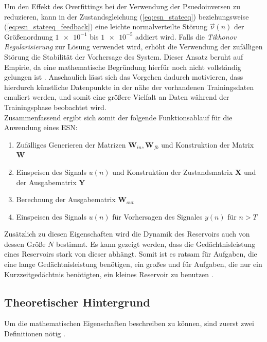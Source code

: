 Um den Effekt des Overfittings bei der Verwendung der Psuedoinversen zu reduzieren, kann in der Zustandsgleichung (\ref{eq:esn_stateeq}) beziehungsweise (\ref{eq:esn_stateeq_feedback}) eine leichte normalverteilte Störung $\vec{\nu}(n)$ der Größenordnung $\num{1e-1}$ bis $\num{1e-5}$ addiert wird. Falls die \textit{Tikhonov Regularisierung} zur Lösung verwendet wird, erhöht die Verwendung der zufälligen Störung die Stabilität der Vorhersage des System. Dieser Ansatz beruht auf Empirie, da eine mathematische Begründung hierfür noch nicht vollständig gelungen ist \citep{jaeger2010, lukoseviciusa2009}. Anschaulich lässt sich das Vorgehen dadurch motivieren, dass hierdurch künstliche Datenpunkte in der nähe der vorhandenen Trainingsdaten emuliert werden, und somit eine größere Vielfalt an Daten während der Trainingsphase beobachtet wird.\\

Zusammenfassend ergibt sich somit der folgende Funktionsablauf für die Anwendung eines \textsc{ESN}:

\singlespacing
\begin{enumerate}
	\item Zufälliges Generieren der Matrizen $\mathbf{W}_{in}, \mathbf{W}_{fb}$ und Konstruktion der Matrix $\mathbf{W}$ 
	\item Einspeisen des Signals $u(n)$ und Konstruktion der Zustandsmatrix $\mathbf{X}$ und der Ausgabematrix $\mathbf{Y}$ 
	\item Berechnung der Ausgabematrix $\mathbf{W}_{out}$
	\item Einspeisen des Signals $u(n)$ für Vorhersagen des Signales $y(n)$ für $n > T$
\end{enumerate}
\onehalfspacing

Zusätzlich zu diesen Eigenschaften wird die Dynamik des Reservoirs auch von dessen Größe $N$ bestimmt. Es kann gezeigt werden, dass die Gedächtnisleistung eines Reservoirs stark von dieser abhängt. Somit ist es ratsam für Aufgaben, die eine lange Gedächtnisleistung benötigen, ein großes und für Aufgaben, die nur ein Kurzzeitgedächtnis benötigten, ein kleines Reservoir zu benutzen \citep{jeagerTut2002}.





\subsection{Theoretischer Hintergrund}
\label{sc:esn_theory}
Um die mathematischen Eigenschaften beschreiben zu können, sind zuerst zwei Definitionen nötig \cite{yildiz}.


